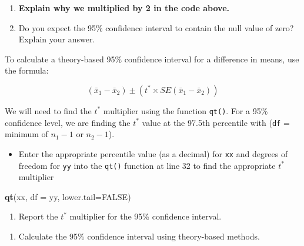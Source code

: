 \documentclass[
]{report}
\newenvironment{Shaded}{\begin{snugshade}}{\end{snugshade}}
\newcommand{\AttributeTok}[1]{\textcolor[rgb]{0.13,0.29,0.53}{#1}}
\newcommand{\ConstantTok}[1]{\textcolor[rgb]{0.56,0.35,0.01}{#1}}
\newcommand{\FunctionTok}[1]{\textcolor[rgb]{0.13,0.29,0.53}{\textbf{#1}}}
\newcommand{\NormalTok}[1]{#1}
\providecommand{\tightlist}{%
  \setlength{\itemsep}{0pt}\setlength{\parskip}{0pt}}
\begin{document}
\vspace{0.2in}

\begin{enumerate}
\def\labelenumi{\arabic{enumi}.}
\setcounter{enumi}{10}
\item
  \textbf{Explain why we multiplied by 2 in the code above.}
  \vspace{0.3in}
\item
  Do you expect the 95\% confidence interval to contain the null value of zero? Explain your answer.
  \vspace{0.8in}
\end{enumerate}

To calculate a theory-based 95\% confidence interval for a difference in means, use the formula:

\[(\bar{x}_1- \bar{x}_2)\pm (t^* \times SE(\bar{x}_1- \bar{x}_2))\]

We will need to find the \(t^*\) multiplier using the function \texttt{qt()}. For a 95\% confidence level, we are finding the \(t^*\) value at the 97.5th percentile with (\texttt{df} = minimum of \(n_1 - 1\) or \(n_2 - 1\)).

\begin{itemize}
\tightlist
\item
  Enter the appropriate percentile value (as a decimal) for \texttt{xx} and degrees of freedom for \texttt{yy} into the \texttt{qt()} function at line 32 to find the appropriate \(t^*\) multiplier
\end{itemize}

\begin{Shaded}
\begin{Highlighting}[]
\FunctionTok{qt}\NormalTok{(xx, }\AttributeTok{df =}\NormalTok{ yy, }\AttributeTok{lower.tail=}\ConstantTok{FALSE}\NormalTok{)}
\end{Highlighting}
\end{Shaded}

\begin{enumerate}
\def\labelenumi{\arabic{enumi}.}
\setcounter{enumi}{12}
\tightlist
\item
  Report the \(t^*\) multiplier for the 95\% confidence interval.
\end{enumerate}

\vspace{0.3in}

\begin{enumerate}
\def\labelenumi{\arabic{enumi}.}
\setcounter{enumi}{13}
\tightlist
\item
  Calculate the 95\% confidence interval using theory-based methods.
\end{enumerate}
\end{document}
